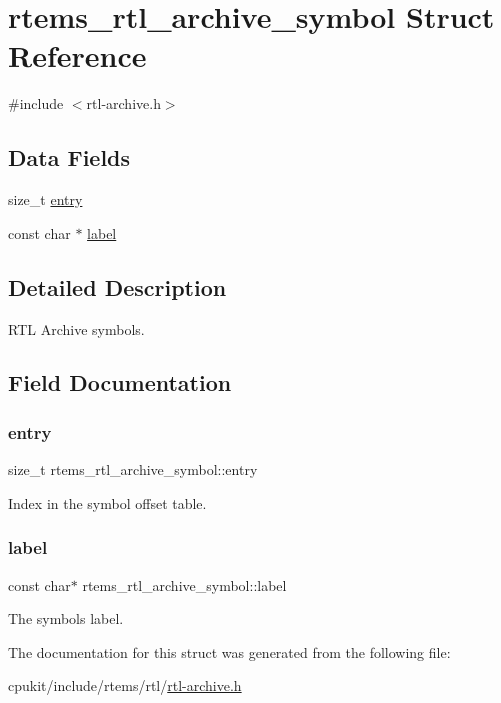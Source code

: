 \hypertarget{structrtems__rtl__archive__symbol}{}\section{rtems\+\_\+rtl\+\_\+archive\+\_\+symbol Struct Reference}
\label{structrtems__rtl__archive__symbol}


{\ttfamily \#include $<$rtl-\/archive.\+h$>$}

\subsection*{Data Fields}
\begin{DoxyCompactItemize}
\item 
size\+\_\+t \mbox{\hyperlink{structrtems__rtl__archive__symbol_a5029d272003227d3a0780547b6cbe149}{entry}}
\item 
const char $\ast$ \mbox{\hyperlink{structrtems__rtl__archive__symbol_a9881fb0017546e86510bd0c6aec4f719}{label}}
\end{DoxyCompactItemize}


\subsection{Detailed Description}
R\+TL Archive symbols. 

\subsection{Field Documentation}
\mbox{\label{structrtems__rtl__archive__symbol_a5029d272003227d3a0780547b6cbe149}} 
\subsubsection{\texorpdfstring{entry}{entry}}
{\footnotesize\ttfamily size\+\_\+t rtems\+\_\+rtl\+\_\+archive\+\_\+symbol\+::entry}

Index in the symbol offset table. \mbox{\label{structrtems__rtl__archive__symbol_a9881fb0017546e86510bd0c6aec4f719}} 
\subsubsection{\texorpdfstring{label}{label}}
{\footnotesize\ttfamily const char$\ast$ rtems\+\_\+rtl\+\_\+archive\+\_\+symbol\+::label}

The symbol\textquotesingle{}s label. 

The documentation for this struct was generated from the following file\+:\begin{DoxyCompactItemize}
\item 
cpukit/include/rtems/rtl/\mbox{\hyperlink{rtl-archive_8h}{rtl-\/archive.\+h}}\end{DoxyCompactItemize}
